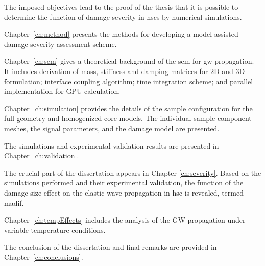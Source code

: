 The imposed objectives lead to the proof of the thesis that it is possible to determine the function of damage severity in \acp{hsc} by numerical simulations.

Chapter~\ref{ch:method} presents the methods for developing a model-assisted damage severity assessment scheme.

Chapter~\ref{ch:sem} gives a theoretical background of the \ac{sem} for \ac{gw} propagation.
It includes derivation of mass, stiffness and damping matrices for 2D and 3D formulation; interface coupling algorithm; time integration scheme; and parallel implementation for GPU calculation.

Chapter~\ref{ch:simulation} provides the details of the sample configuration for the full geometry and homogenized core models. The individual sample component meshes, the signal parameters, and the damage model are presented.

The simulations and experimental validation results are presented in Chapter~\ref{ch:validation}.

The crucial part of the dissertation appears in Chapter \ref{ch:severity}. Based on the simulations performed and their experimental validation, the function of the damage size effect on the elastic wave propagation in \ac{hsc} is revealed, termed \ac{madif}.

Chapter~\ref{ch:tempEffects} includes the analysis of the GW propagation under variable temperature conditions.

The conclusion of the dissertation and final remarks are provided in Chapter~\ref{ch:conclusions}.

